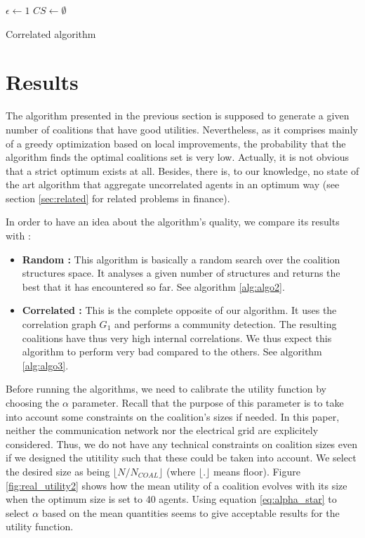 \documentclass[conference]{IEEEtran}
\begin{document}
\begin{algorithm}
 $ \epsilon \leftarrow 1 $ \;
 $ CS \leftarrow \emptyset $\;
 \caption{Correlated algorithm}
\label{alg:algo3}
\end{algorithm}

\section{Results}

The algorithm presented in the previous section is supposed to generate a given number of coalitions that have good utilities. Nevertheless, as it comprises mainly of a greedy optimization based on local improvements, the probability that the algorithm finds the optimal coalitions set is very low. Actually, it is not obvious that a strict optimum exists at all. Besides, there is, to our knowledge, no state of the art algorithm that aggregate uncorrelated agents in an optimum way (see section \ref{sec:related} for related problems in finance).


In order to have an idea about the algorithm's quality, we compare its results with :
\begin{itemize}
\item \textbf{Random :} This algorithm is basically a random search over the coalition structures space. It analyses a given number of structures and returns the best that it has encountered so far. See algorithm \ref{alg:algo2}.
\item \textbf{Correlated :} This is the complete opposite of our algorithm. It uses the correlation graph $ G_{1} $ and performs a community detection. The resulting coalitions have thus very high internal correlations. We thus expect this algorithm to perform very bad compared to the others. See algorithm \ref{alg:algo3}.
\end{itemize} 


Before running the algorithms, we need to calibrate the utility function by choosing the $ \alpha $ parameter. Recall that the purpose of this parameter is to take into account some constraints on the coalition's sizes if needed. In this paper, neither the communication network nor the electrical grid are explicitely considered. Thus, we do not have any technical constraints on coalition sizes even if we designed the utitility such that these could be taken into account. We select the desired size as being $ \lfloor N/N_{COAL} \rfloor $ (where $ \lfloor.\rfloor $ means floor). Figure \ref{fig:real_utility2} shows how the mean utility of a coalition evolves with its size when the optimum size is set to 40 agents. Using equation \ref{eq:alpha_star} to select $ \alpha $ based on the mean quantities seems to give acceptable results for the utility function.
\end{document}
